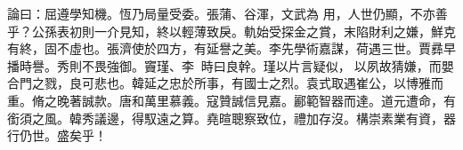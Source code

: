 \begin{pinyinscope}
 論曰：屈遵學知機。恆乃局量受委。張蒲、谷渾，文武為
 用，人世仍顯，不亦善乎？公孫表初則一介見知，終以輕薄致戾。軌始受探金之賞，末陷財利之嫌，鮮克有終，固不虛也。張濟使於四方，有延譽之美。李先學術嘉謀，荷遇三世。賈彞早播時譽。秀則不畏強御。竇瑾、李，時曰良幹。瑾以片言疑似，以夙故猜嫌，而嬰合門之戮，良可悲也。韓延之忠於所事，有國士之烈。袁式取遇崔公，以博雅而重。脩之晚著誠款。唐和萬里慕義。寇贊誠信見嘉。酈範智器而達。道元遭命，有銜須之風。韓秀議邊，得馭遠之算。堯暄聰察致位，禮加存沒。構崇素業有資，器行仍世。盛矣乎！



\end{pinyinscope}